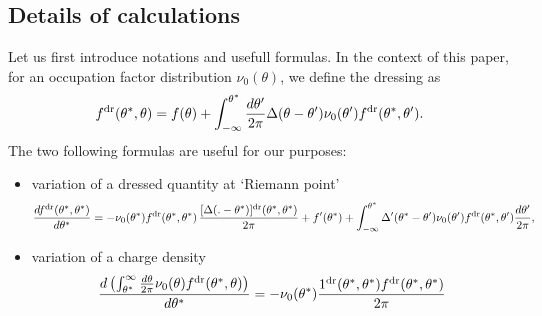 \documentclass[submission, Phys]{SciPost}
\begin{document}
\begin{appendix}


\section{Details of calculations}
Let us first introduce notations and usefull formulas. 
In the context of this paper, for an occupation factor distribution $\nu_0(\theta)$, we define the dressing  as
\begin{equation}
	\label{eq:dressing}
f^{\rm dr}(\theta^*,\theta) = f(\theta) + \int_{-\infty}^{\theta^*}\frac{d\theta'}{2\pi}   \Delta(\theta-\theta') \nu_0 (\theta') f^{\rm dr}(\theta^*,\theta') .
\end{equation}
The two following formulas are useful for our purposes:
\begin{itemize}
	\item variation of a dressed quantity at `Riemann point'
		 \begin{equation}
		 	\label{eq:variation_fdr_Rp}
     \frac{d   f^{\rm dr}(\theta^*,\theta^* ) }{d\theta^*} = -  \nu_0 (\theta^*) f^{\rm dr}(\theta^*,\theta^*)  \, \frac{[ \Delta(.-\theta^*) ]^{\rm dr}(\theta^*,\theta ^*)}{2\pi} +  f' (\theta^*)  +  \int_{-\infty}^{\theta^*}  \Delta'(\theta^*-\theta')  \nu_0 (\theta') f^{\rm dr}(\theta^*,\theta')  \frac{d\theta'}{2\pi}  ,       
	\end{equation}
	\item variation of a charge density
		 \begin{equation}
		 	\label{eq:variation_Q}
            \frac{d \left ( \int_{\theta^*}^\infty \frac{d \theta}{2\pi} \nu_0 (\theta)   f^{\rm dr}(\theta^*,\theta)\right )}{d\theta^*}=
            - \nu_0(\theta^*) \frac{1^{\rm dr} (\theta^*,\theta^*)  f^{\rm dr} (\theta^*,\theta^*)}{2\pi} 
		\end{equation}	
\end{itemize}



\end{appendix}
\end{document}

